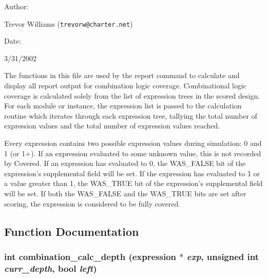 \begin{Desc}
\item[Author: ]\par
Trevor Williams ({\tt trevorw@charter.net}) \end{Desc}
\begin{Desc}
\item[Date: ]\par
3/31/2002

 The functions in this file are used by the report command to calculate and display all  report output for combination logic coverage. Combinational logic coverage is calculated solely from the list of expression trees in the scored design. For each module or instance, the expression list is passed to the calculation routine which iterates through each expression tree, tallying the total number of expression values and the total number of expression values reached.

 Every expression contains two possible expression values during simulation: 0 and 1 (or 1+). If an expression evaluated to some unknown value, this is not recorded by Covered. If an expression has evaluated to 0, the WAS\_\-FALSE bit of the expression's supplemental field will be set. If the expression has evaluated to 1 or a value greater than 1, the WAS\_\-TRUE bit of the expression's supplemental field will be set. If both the WAS\_\-FALSE and the WAS\_\-TRUE bits are set after scoring, the expression is considered to be fully covered.\end{Desc}


\subsection{Function Documentation}
\subsubsection{\setlength{\rightskip}{0pt plus 5cm}int combination\_\-calc\_\-depth ({\bf expression} $\ast$ {\em exp}, unsigned int {\em curr\_\-depth}, {\bf bool} {\em left})}\label{comb_8c_a6}


